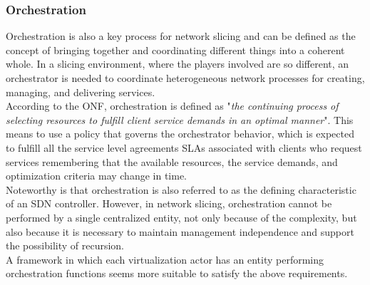 \documentclass[a4paper,12pt]{report} %
\begin{document}
\subsubsection{Orchestration}
Orchestration is also a key process for network
slicing and can be
defined as the concept of bringing together and coordinating different things into a coherent whole.
In a slicing environment, where the players involved
are so different, an orchestrator is needed to coordinate heterogeneous network processes for
creating, managing, and delivering services.\\
According to the \gls{ONF},
orchestration is defined as "\textit{the continuing process of
selecting resources to fulfill client service demands
in an optimal manner}". This means to use a policy that governs the orchestrator behavior, which is expected to fulfill all the service level agreements \gls{SLA}s associated with clients
who request services remembering
that the available resources, the service demands, and optimization criteria may change in time. \\
Noteworthy is that orchestration is also referred to as the defining
characteristic of an SDN controller.
However, in network slicing, orchestration cannot be performed by a single centralized entity,
not only because of the complexity, but also because it
is necessary to maintain management independence and support the possibility of recursion. \\
A framework in which each virtualization
actor has an entity performing orchestration functions seems more suitable to satisfy the
above requirements. 
\end{document}
